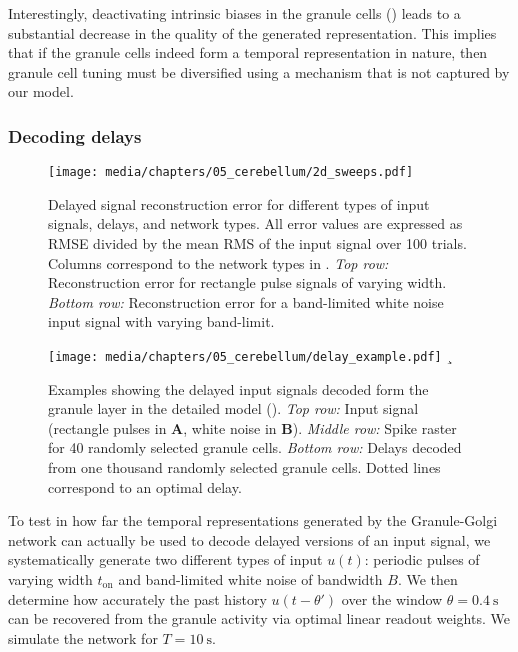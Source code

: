 Interestingly, deactivating intrinsic biases in the granule cells () leads to a substantial decrease in the quality of the generated representation.
This implies that if the granule cells indeed form a temporal representation in nature, then granule cell tuning must be diversified using a mechanism that is not captured by our model.

\subsubsection{Decoding delays}

\begin{figure}
	\centering
	\texttt{[image: media/chapters/05\_cerebellum/2d\_sweeps.pdf]}
	\caption[Delayed signal reconstruction errors in the Cerebellum model.]{Delayed signal reconstruction error for different types of input signals, delays, and network types. All error values are expressed as RMSE divided by the mean RMS of the input signal over 100 trials. Columns correspond to the network types in . \emph{Top row:} Reconstruction error for rectangle pulse signals of varying width. \emph{Bottom row:} Reconstruction error for a band-limited white noise input signal with varying band-limit.}
	\label{fig:cerebellum_2d_sweeps}
\end{figure}

\begin{figure}
	\centering
    \texttt{[image: media/chapters/05\_cerebellum/delay\_example.pdf]}%
    {\label{fig:delay_example_a}}%
    {¸\label{fig:delay_example_b}}%
	\caption[Examples showing the delayed input signals decoded form the granule layer in the detailed model.]{Examples showing the delayed input signals decoded form the granule layer in the detailed model (). \emph{Top row:} Input signal (rectangle pulses in \textbf{A}, white noise in \textbf{B}). \emph{Middle row:} Spike raster for 40 randomly selected granule cells. \emph{Bottom row:} Delays decoded from one thousand randomly selected granule cells. Dotted lines correspond to an optimal delay.}
	\label{fig:cerebellum_delay_example}
\end{figure}

To test in how far the temporal representations generated by the Granule-Golgi network can actually be used to decode delayed versions of an input signal, we systematically generate two different types of input $u(t)$: periodic pulses of varying width $t_\mathrm{on}$ and band-limited white noise of bandwidth $B$.
We then determine how accurately the past history $u(t - \theta')$ over the window $\theta = \SI{0.4}{\second}$ can be recovered from the granule activity via optimal linear readout weights.
We simulate the network for $T = \SI{10}{\second}$.

